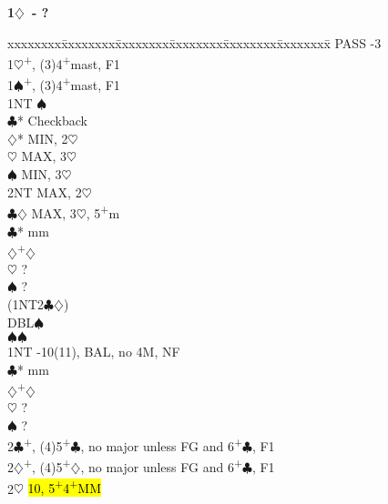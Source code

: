 \documentclass[10pt]{article}
\renewcommand{\c}{$\clubsuit$}
\renewcommand{\d}{$\diamondsuit$}
\newcommand{\h}{$\heartsuit$}
\newcommand{\s}{$\spadesuit$}
\newcommand{\p}{\textsuperscript{+}}
\newcommand{\m}{\textsuperscript{\textminus}}
\newcommand{\x}{DBL}
\newenvironment{bidtable}[1][]
{\textbf{#1}
  \begin{adjustwidth}{1em}{}
    \addvspace{2pt}
    \begin{tabbing}
      xxxxxxxx\=xxxxxxxx\=xxxxxxxx\=xxxxxxxx\=xxxxxxxx\=xxxxxxxx\=\kill}
{\end{tabbing}\end{adjustwidth}\bigskip}%
\begin{document}
\begin{multicols*}{2}
\begin{bidtable}[1\d\ - ?]
PASS      -3                                              \\
1\h       {}\p , (3)4\p mast, F1                            \\
1\s       {}\p , (3)4\p mast, F1                            \\
          \> 1NT        \m\s                              \\
          \>            \c* \> Checkback                  \\
          \>            \>      \d*  \> MIN, 2\m\h        \\
          \>            \>      \h   \> MAX, 3\h          \\
          \>            \>      \s   \> MIN, 3\h          \\
          \>            \>      \> 2NT   \> MAX, 2\m\h        \\
          \>            \>      \c\d \> MAX, 3\h, 5\p m   \\
          \c*       {} mm                              \\
          \d        {}\p\d                              \\
          \h        \> ?                                  \\
          \s        \> ?                                  \\
          \> (1NT2\c\d) \>                                    \\
          \>            \> \x   {}\s                        \\
          \>            \s  {}\s                        \\
1NT       -10(11), BAL, no 4M, NF                         \\
          \c*       {} mm                              \\
          \d        {}\p\d                              \\
          \h        \> ?                                  \\
          \s        \> ?                                  \\
2\c       {}\p, (4)5\p\c, no major unless FG and 6\p\c, F1 \\
2\d       {}\p, (4)5\p\d, no major unless FG and 6\p\c, F1 \\
2\h       \> \hl{10\m, 5\p4\p MM}                             \\

\end{bidtable}
\end{multicols*}
\end{document}
